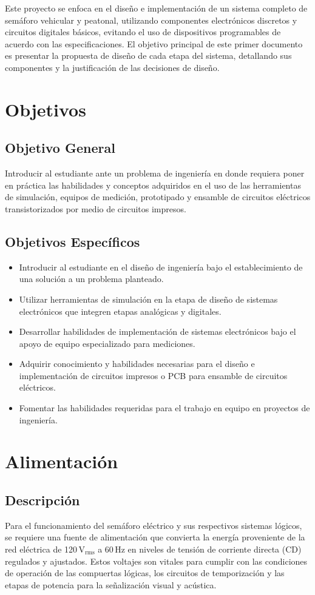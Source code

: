 \documentclass[12pt, journal, onecolumn]{IEEEtran}
\begin{document}
	Este proyecto se enfoca en el diseño e implementación de un sistema completo de semáforo vehicular y peatonal, utilizando componentes electrónicos discretos y circuitos digitales básicos, evitando el uso de dispositivos programables de acuerdo con las especificaciones. El objetivo principal de este primer documento es presentar la propuesta de diseño de cada etapa del sistema, detallando sus componentes y la justificación de las decisiones de diseño.
	
	\section{Objetivos}
	\subsection{Objetivo General}
	Introducir al estudiante ante un problema de ingeniería en donde requiera poner en práctica las habilidades y conceptos adquiridos en el uso de las herramientas de simulación, equipos de medición, prototipado y ensamble de circuitos eléctricos transistorizados por medio de circuitos impresos.
	
	\subsection{Objetivos Específicos}
	\begin{itemize}
		\item Introducir al estudiante en el diseño de ingeniería bajo el establecimiento de una solución a un problema planteado.
		\item Utilizar herramientas de simulación en la etapa de diseño de sistemas electrónicos que integren etapas analógicas y digitales.
		\item Desarrollar habilidades de implementación de sistemas electrónicos bajo el apoyo de equipo especializado para mediciones.
		\item Adquirir conocimiento y habilidades necesarias para el diseño e implementación de circuitos impresos o PCB para ensamble de circuitos eléctricos.
		\item Fomentar las habilidades requeridas para el trabajo en equipo en proyectos de ingeniería.
	\end{itemize}
	
	\section{Alimentación}
	\subsection{Descripción}
	Para el funcionamiento del semáforo eléctrico y sus respectivos sistemas lógicos, se requiere una fuente de alimentación que convierta la energía proveniente de la red eléctrica de 120\,$\text{V}_{\text{rms}}$ a 60\,Hz en niveles de tensión de corriente directa (CD) regulados y ajustados. Estos voltajes son vitales para cumplir con las condiciones de operación de las compuertas lógicas, los circuitos de temporización y las etapas de potencia para la señalización visual y acústica.
	
\end{document}
